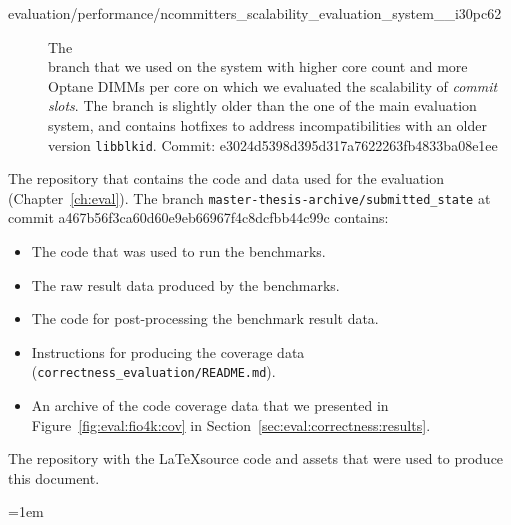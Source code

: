 \documentclass[12pt,a4paper,twoside]{book}
\begin{document}
\begin{description}
    \item[{\footnotesize evaluation/performance/ncommitters\_scalability\_evaluation\_system\_\_i30pc62}]   The \\ branch that we used on the system with higher core count and more Optane DIMMs per core on which we evaluated the scalability of \textit{commit slots}.
                                                                                            The branch is slightly older than the one of the main evaluation system, and contains hotfixes to address incompatibilities with an older version \lstinline{libblkid}.
                                                                                            {Commit: \footnotesize e3024d5398d395d317a7622263fb4833ba08e1ee}

\end{description}


The repository that contains the code and data used for the evaluation (Chapter~\ref{ch:eval}).
The branch \lstinline{master-thesis-archive/submitted_state} at commit a467b56f3\-ca60d60e9eb66967f4c8dcfbb44c99c contains:
\begin{itemize}[noitemsep]
    \item The code that was used to run the benchmarks.
    \item The raw result data produced by the benchmarks.
    \item The code for post-processing the benchmark result data.
    \item Instructions for producing the coverage data \\ (\lstinline{correctness_evaluation/README.md}).
    \item An archive of the code coverage data that we presented in Figure~\ref{fig:eval:fio4k:cov} in Section~\ref{sec:eval:correctness:results}.
\end{itemize}



The repository with the \LaTeX source code and assets that were used to produce this document.


\cleardoublepage
{}
{}
\emergencystretch=1em
\printbibliography
\end{document}
